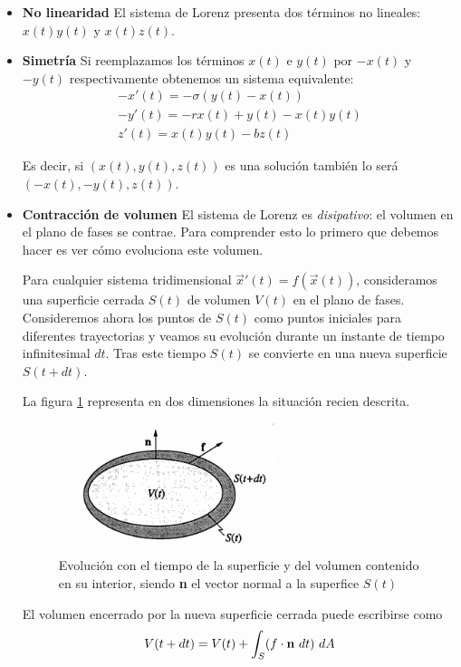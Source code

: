 \begin{itemize}
\item \textbf{No linearidad}
El sistema de Lorenz presenta dos términos no lineales: $x(t)y(t)$ y $x(t)z(t)$.

\item \textbf{Simetría}
Si reemplazamos los términos $x(t)$ e $y(t)$ por $-x(t)$ y $-y(t)$ respectivamente obtenemos un sistema equivalente:
\[\begin{array}{l}
-x'(t) = -σ(y(t)-x(t)) \\
-y'(t) = -rx(t)+y(t)-x(t)y(t)\\
z'(t) = x(t)y(t)-bz(t)
\end{array}\]

Es decir, si $(x(t),y(t),z(t))$ es una solución también lo será $(-x(t),-y(t),z(t))$.

\item \textbf{Contracción de volumen}
El sistema de Lorenz es \emph{disipativo}: el volumen en el plano de fases se contrae. Para comprender esto lo primero que debemos hacer es ver cómo evoluciona este volumen.

Para cualquier sistema tridimensional $\vec{x}'(t) =f(\vec{x}(t))$, consideramos una superficie cerrada $S(t)$ de volumen $V(t)$ en el plano de fases. Consideremos ahora los puntos de $S(t)$ como puntos iniciales para diferentes trayectorias y veamos su evolución durante un instante de tiempo infinitesimal $dt$. Tras este tiempo $S(t)$ se convierte en una nueva superficie $S(t+dt)$.

La figura \ref{fig:volumen2D} representa en dos dimensiones la situación recien descrita.
\begin{figure}[hbtp]
\centering
\includegraphics[width = 0.6\textwidth]{img/volumen2D.png}
\caption{Evolución con el tiempo de la superficie y del volumen contenido en su interior, siendo \textbf{n} el vector normal a la superfice $S(t)$}
\label{fig:volumen2D}
\end{figure}

El volumen encerrado por la nueva superficie cerrada puede escribirse como
\[V(t+dt)=V(t) + \int_S (f\cdot \text{\textbf{n}}\ dt)\ dA\]


\end{itemize}
